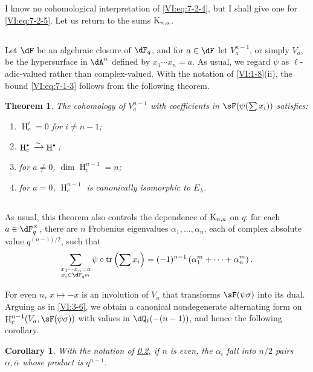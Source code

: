 \documentclass[12pt,oneside,english]{smfbook}
\DeclareMathOperator{\h}{H}
\DeclareMathOperator{\tr}{tr}
\newcommand{\iso}{\xrightarrow\sim}
\newcommand{\kloos}{\textnormal{K}} %
\newtheorem{corollary_}[subsection]{Corollary}
\newtheorem{theorem_}[subsection]{Theorem}
\let\oldbullet\bullet
\renewcommand{\bullet}{\textnormal{\tiny$\oldbullet$}}
\begin{document}
I know no cohomological interpretation of \eqref{VI:eq:7-2-4}, but I shall give one for \eqref{VI:eq:7-2-5}. Let us return to the sums $\kloos_{n,a}$.

\subsection{}\label{VI:7-3}

Let $\dF$ be an algebraic closure of $\dF_q$, and for $a\in\dF$ let $V_a^{n-1}$, or simply $V_a$, be the hypersurface in $\dA^n$ defined by $x_1\cdots x_n=a$. As usual, we regard $\psi$ as $\ell$-adic-valued rather than complex-valued. With the notation of \ref{VI:1-8}(ii), the bound \eqref{VI:eq:7-1-3} follows from the following theorem.

\begin{theorem_}\label{VI:7-4}
The cohomology of $V_a^{n-1}$ with coefficients in $\sF(\psi(\sum x_i))$ satisfies:
\begin{enumerate}[\indent (i)]
  \item $\h_c^i=0$ for $i\ne n-1$;
  \item $\h_c^\bullet{} \iso \h^\bullet{}$;
  \item for $a\ne0$, $\dim\h_c^{n-1}{}=n$;
  \item for $a=0$, $\h_c^{n-1}{}$ is canonically isomorphic to $E_\lambda$.
\end{enumerate}
\end{theorem_}

\subsection{}\label{VI:7-5}

As usual, this theorem also controls the dependence of $\kloos_{n,a}$ on $q$: for each $a\in\dF_q^\times$, there are $n$ Frobenius eigenvalues $\alpha_1,\dots,\alpha_n$, each of complex absolute value $q^{(n-1)/2}$, such that
\[
  \sum_{\substack{x_1\dotsm x_n = a \\ x_i\in \dF_{q^m}}} \psi\circ \tr\left(\sum x_i\right) = (-1)^{n-1} \left(\alpha_1^m + \cdots + \alpha_n^m \right) \text{.}
\]

For even $n$, $x\mapsto-x$ is an involution of $V_a$ that transforms $\sF(\psi\sigma)$ into its dual. Arguing as in \ref{VI:3-6}, we obtain a canonical nondegenerate alternating form on $\h_c^{n-1}(V_a,\sF(\psi\sigma))$ with values in $\dQ_\ell(-(n-1))$, and hence the following corollary.

\begin{corollary_}\label{VI:7-6}
With the notation of \ref{VI:7-5}, if $n$ is even, the $\alpha_i$ fall into $n/2$ pairs $\alpha,\bar\alpha$ whose product is $q^{n-1}$.
\end{corollary_}
\end{document}
